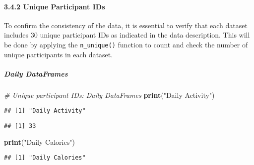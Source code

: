 \documentclass[
]{article}
\newenvironment{Shaded}{\begin{snugshade}}{\end{snugshade}}
\newcommand{\CommentTok}[1]{\textcolor[rgb]{0.56,0.35,0.01}{\textit{#1}}}
\newcommand{\FunctionTok}[1]{\textcolor[rgb]{0.13,0.29,0.53}{\textbf{#1}}}
\newcommand{\NormalTok}[1]{#1}
\newcommand{\SpecialCharTok}[1]{\textcolor[rgb]{0.81,0.36,0.00}{\textbf{#1}}}
\newcommand{\StringTok}[1]{\textcolor[rgb]{0.31,0.60,0.02}{#1}}
\begin{document}
\hypertarget{unique-participant-ids}{%
\paragraph{3.4.2 Unique Participant IDs}\label{unique-participant-ids}}

To confirm the consistency of the data, it is essential to verify that
each dataset includes 30 unique participant IDs as indicated in the data
description. This will be done by applying the \texttt{n\_unique()}
function to count and check the number of unique participants in each
dataset.

\hypertarget{daily-dataframes-2}{%
\subparagraph{Daily DataFrames}\label{daily-dataframes-2}}

\begin{Shaded}
\begin{Highlighting}[]
\CommentTok{\# Unique participant IDs: Daily DataFrames}
\FunctionTok{print}\NormalTok{(}\StringTok{"Daily Activity"}\NormalTok{)}
\end{Highlighting}
\end{Shaded}

\begin{verbatim}
## [1] "Daily Activity"
\end{verbatim}

\begin{Shaded}
\end{Shaded}

\begin{verbatim}
## [1] 33
\end{verbatim}

\begin{Shaded}
\begin{Highlighting}[]
\FunctionTok{print}\NormalTok{(}\StringTok{"Daily Calories"}\NormalTok{)}
\end{Highlighting}
\end{Shaded}

\begin{verbatim}
## [1] "Daily Calories"
\end{verbatim}

\begin{Shaded}
\end{Shaded}
\end{document}
